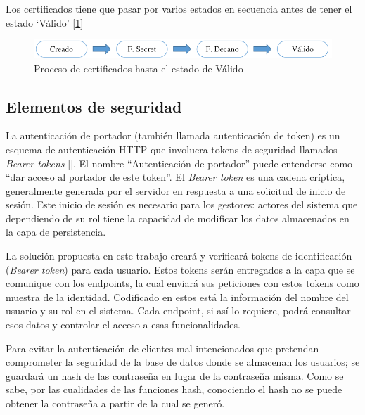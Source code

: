 Los certificados tiene que pasar por varios estados en secuencia antes de tener el estado `Válido' [\ref{fig:12}]
\begin{figure}[h]
	\includegraphics[width=\linewidth]{Graphics/status.png}
	\caption{Proceso de certificados hasta el estado de Válido}
	\label{fig:12}
\end{figure} 

\subsection{Elementos de seguridad}
La autenticación de portador (también llamada autenticación de token) es un esquema de autenticación HTTP que involucra tokens de seguridad llamados \textit{Bearer tokens} [\cite{98}]. El nombre ``Autenticación de portador'' puede entenderse como ``dar acceso al portador de este token''. El \textit{Bearer token} es una cadena críptica, generalmente generada por el servidor en respuesta a una solicitud de inicio de sesión. Este inicio de sesión es necesario para los gestores: actores del sistema que dependiendo de su rol tiene la capacidad de modificar los datos almacenados en la capa de persistencia. 

La solución propuesta en este trabajo creará y verificará tokens de identificación (\textit{Bearer token}) para cada usuario. Estos tokens serán entregados a la capa que se comunique con los endpoints, la cual enviará sus peticiones con estos tokens como muestra de la identidad. Codificado en estos está la información del nombre del usuario y su rol en el sistema. Cada endpoint, si así lo requiere, podrá consultar esos datos y controlar el acceso a esas funcionalidades.

Para evitar la autenticación de clientes mal intencionados que pretendan comprometer la seguridad de la base de datos donde se almacenan los usuarios; se guardará un hash de las contraseña en lugar de la contraseña misma. Como se sabe, por las cualidades de las funciones hash, conociendo el hash no se puede obtener la contraseña a partir de la cual se generó.


